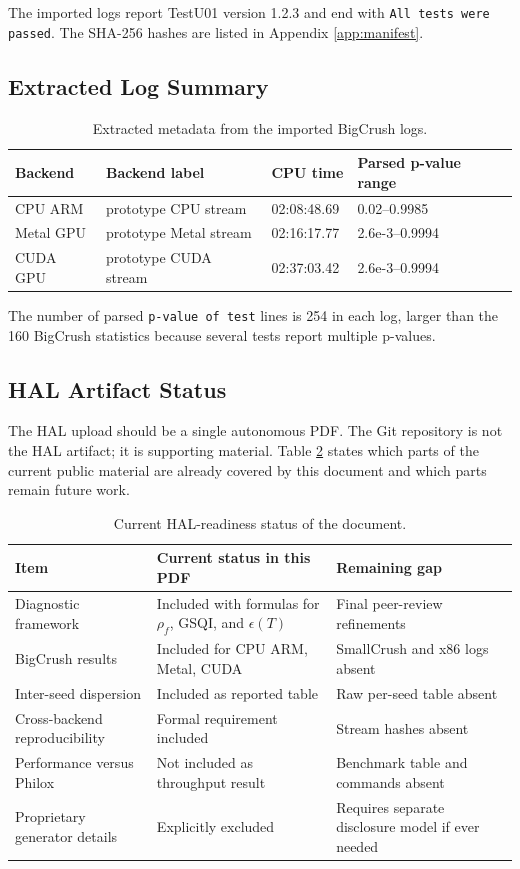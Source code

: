 \documentclass[11pt,a4paper]{article}
\begin{document}
The imported logs report TestU01 version 1.2.3 and end with \texttt{All tests were passed}. The SHA-256 hashes are listed in Appendix \ref{app:manifest}.

\subsection{Extracted Log Summary}

\begin{table}[ht]
\centering
\small
\begin{tabular}{llll}
\toprule
Backend & Backend label & CPU time & Parsed p-value range \\
\midrule
CPU ARM & prototype CPU stream & 02:08:48.69 & 0.02--0.9985 \\
Metal GPU & prototype Metal stream & 02:16:17.77 & 2.6e-3--0.9994 \\
CUDA GPU & prototype CUDA stream & 02:37:03.42 & 2.6e-3--0.9994 \\
\bottomrule
\end{tabular}
\caption{Extracted metadata from the imported BigCrush logs.}
\label{tab:logsummary}
\end{table}

The number of parsed \texttt{p-value of test} lines is 254 in each log, larger than the 160 BigCrush statistics because several tests report multiple p-values.

\subsection{HAL Artifact Status}

The HAL upload should be a single autonomous PDF. The Git repository is not the HAL artifact; it is supporting material. Table \ref{tab:hal_status} states which parts of the current public material are already covered by this document and which parts remain future work.

\begin{table}[ht]
\centering
\small
\begin{tabular}{p{}p{}p{}}
\toprule
Item & Current status in this PDF & Remaining gap \\
\midrule
Diagnostic framework & Included with formulas for $\rho_f$, GSQI, and $\epsilon(T)$ & Final peer-review refinements \\
BigCrush results & Included for CPU ARM, Metal, CUDA & SmallCrush and x86 logs absent \\
Inter-seed dispersion & Included as reported table & Raw per-seed table absent \\
Cross-backend reproducibility & Formal requirement included & Stream hashes absent \\
Performance versus Philox & Not included as throughput result & Benchmark table and commands absent \\
Proprietary generator details & Explicitly excluded & Requires separate disclosure model if ever needed \\
\bottomrule
\end{tabular}
\caption{Current HAL-readiness status of the document.}
\label{tab:hal_status}
\end{table}
\end{document}

